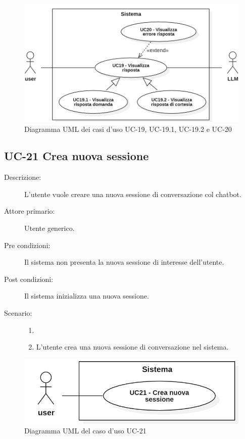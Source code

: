 \begin{figure}[H]
    \centering
    \includegraphics[width=0.77\linewidth]{UC19.PNG} 
    \caption{Diagramma UML dei casi d'uso UC-19, UC-19.1, UC-19.2 e UC-20}
\end{figure}

\subsection{UC-21 Crea nuova sessione}
\begin{description}
    \item[Descrizione:] L'utente vuole creare una nuova sessione di conversazione col chatbot.
    \item[Attore primario:] Utente generico.
    \item[Pre condizioni:] Il sistema non presenta la nuova sessione di interesse dell'utente.
    \item[Post condizioni:] Il sistema inizializza una nuova sessione.
    \item[Scenario:] 
    \begin{enumerate}
        \item[]
        \item L'utente crea una nuova sessione di conversazione nel sistema.
    \end{enumerate}
\end{description}

\begin{figure}[H]
    \centering
    \includegraphics[width=0.8\linewidth]{UC21.PNG} 
    \caption{Diagramma UML del caso d'uso UC-21}
\end{figure}

